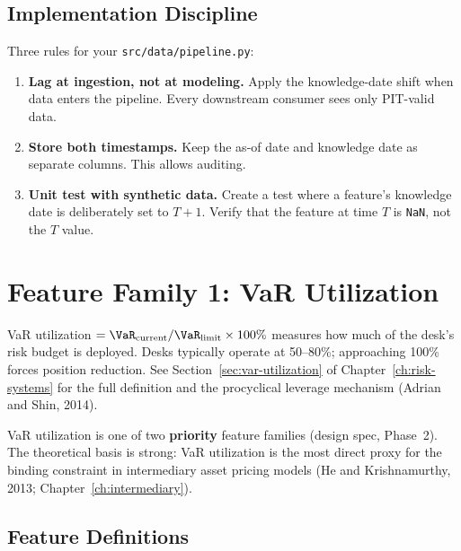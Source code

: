 \subsection{Implementation Discipline}

Three rules for your \texttt{src/data/pipeline.py}:

\begin{enumerate}[nosep]
  \item \textbf{Lag at ingestion, not at modeling.}  Apply the
        knowledge-date shift when data enters the pipeline.  Every
        downstream consumer sees only PIT-valid data.
  \item \textbf{Store both timestamps.}  Keep the as-of date and
        knowledge date as separate columns.  This allows auditing.
  \item \textbf{Unit test with synthetic data.}  Create a test where a
        feature's knowledge date is deliberately set to $T+1$.  Verify
        that the feature at time $T$ is \texttt{NaN}, not the $T$ value.
\end{enumerate}


\section{Feature Family 1: VaR Utilization}
\label{sec:feat-var-util}

\begin{prereq}
VaR utilization $= \VaR_{\text{current}} / \VaR_{\text{limit}} \times
100\%$ measures how much of the desk's risk budget is deployed.
Desks typically operate at 50--80\%; approaching 100\% forces position
reduction.  See Section~\ref{sec:var-utilization} of
Chapter~\ref{ch:risk-systems} for the full definition and the
procyclical leverage mechanism (Adrian and Shin, 2014).
\end{prereq}

VaR utilization is one of two \textbf{priority} feature families
(design spec, Phase~2).  The theoretical basis is strong: VaR
utilization is the most direct proxy for the binding constraint in
intermediary asset pricing models (He and Krishnamurthy, 2013;
Chapter~\ref{ch:intermediary}).

\subsection{Feature Definitions}

